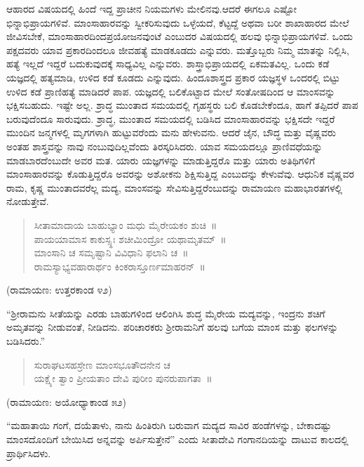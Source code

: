 ಆಹಾರದ ವಿಷಯದಲ್ಲಿ ಹಿಂದೆ ಇದ್ದ ಪ್ರಾಚೀನ ನಿಯಮಗಳು ಮೇಲಿನವು.ಆದರೆ ಈಗಲೂ ಎಷ್ಟೋ ಭಿನ್ನಾಭಿಪ್ರಾಯಗಳಿವೆ. ಮಾಂಸಾಹಾರವನ್ನು ಸ್ವೀಕರಿಸುವುದು ಒಳ್ಳೆಯದೆ, ಕೆಟ್ಟದ್ದೆ ಅಥವಾ ಬರೀ ಶಾಖಾಹಾರದ ಮೇಲೆ ಜೀವಿಸಬೇಕೆ, ಮಾಂಸಾಹಾರದಿಂದ\break ಪ್ರಯೋಜನವುಂಟೆ ಎಂಬುದರ ವಿಷಯದಲ್ಲಿ ಹಲವು ಭಿನ್ನಾಭಿಪ್ರಾಯಗಳಿವೆ. ಒಂದು ಪಕ್ಷದವರು ಯಾವ ಪ್ರಕಾರದಿಂದಲೂ ಜೀವಹತ್ಯೆ ಮಾಡಕೂಡದು ಎನ್ನುವರು. ಮತ್ತೊಬ್ಬರು ನಿಮ್ಮ ಮಾತನ್ನು ನಿಲ್ಲಿಸಿ, ಹತ್ಯೆ ಇಲ್ಲದೆ ಇದ್ದರೆ ಬದುಕುವುದಕ್ಕೆ ಸಾಧ್ಯವಿಲ್ಲ ಎನ್ನುವರು. ಶಾಸ್ತ್ರಾಭಿಪ್ರಾಯದಲ್ಲಿ ಏಕಮತವಿಲ್ಲ. ಒಂದು ಕಡೆ ಯಜ್ಞದಲ್ಲಿ ಹತ್ಯಮಾಡಿ, ಉಳಿದ ಕಡೆ ಕೂಡದು ಎನ್ನುವುದು. ಹಿಂದೂಶಾಸ್ತ್ರದ ಪ್ರಕಾರ ಯಜ್ಞಸ್ಥಳ ಒಂದರಲ್ಲಿ ಬಿಟ್ಟು ಉಳಿದ ಕಡೆ ಪ್ರಾಣಿಹತ್ಯೆ ಮಾಡಿದರೆ ಪಾಪ. ಯಜ್ಞದಲ್ಲಿ ಬಲಿಕೊಟ್ಟಾದ ಮೇಲೆ ಸಂತೋಷದಿಂದ ಆ ಮಾಂಸವನ್ನು ಭಕ್ಷಿಸಬಹುದು. ಇಷ್ಟೇ ಅಲ್ಲ. ಶ್ರಾದ್ಧ ಮುಂತಾದ ಸಮಯದಲ್ಲಿ ಗೃಹಸ್ಥರು ಬಲಿ ಕೊಡಬೇಕೆಂದೂ, ಹಾಗೆ ತಪ್ಪಿದರೆ ಪಾಪ ಬರುವುದೆಂದೂ ಸಾರುವುದು. ಶ್ರಾದ್ಧ, ಮುಂತಾದ ಸಮಯದಲ್ಲಿ ಬಡಿಸಿದ ಮಾಂಸಾಹಾರವನ್ನು ಭಕ್ಷಿಸದೇ ಇದ್ದರೆ ಮುಂದಿನ ಜನ್ಮಗಳಲ್ಲಿ ಮೃಗಗಳಾಗಿ ಹುಟ್ಟುವರೆಂದು ಮನು ಹೇಳುವನು. ಆದರೆ ಜೈನ, ಬೌದ್ಧ ಮತ್ತು ವೈಷ್ಣವರು ಅಂತಹ ಶಾಸ್ತ್ರವನ್ನು ನಾವು ನಂಬುವುದಿಲ್ಲವೆಂದು ತಿರಸ್ಕರಿಸಿದರು. ಯಾವ ಸಮಯದಲ್ಲೂ ಪ್ರಾಣಿವಧೆಯನ್ನು ಮಾಡಬಾರದೆಂಬುದೇ ಅವರ ಮತ. ಯಾರು ಯಜ್ಞಗಳನ್ನು ಮಾಡುತ್ತಿದ್ದರೊ ಮತ್ತು ಯಾರು ಅತಿಥಿಗಳಿಗೆ ಮಾಂಸಾಹಾರವನ್ನು ಕೊಡುತ್ತಿದ್ದರೊ ಅವರನ್ನು ಅಶೋಕನು ಶಿಕ್ಷಿಸುತ್ತಿದ್ದ ಎಂಬುದನ್ನು ಕೇಳುವೆವು. ಆಧುನಿಕ ವೈಷ್ಣವರ ರಾಮ, ಕೃಷ್ಣ ಮುಂತಾದವರೆಲ್ಲ ಮದ್ಯ, ಮಾಂಸವನ್ನು ಸೇವಿಸುತ್ತಿದ್ದರೆಂಬುದನ್ನು ರಾಮಾಯಣ ಮಹಾಭಾರತಗಳಲ್ಲಿ ನೋಡುತ್ತೇವೆ.

\begin{verse}
ಸೀತಾಮಾದಾಯ ಬಾಹುಭ್ಯಾಂ ಮಧು ಮೈರೇಯಕಂ ಶುಚಿ~॥\\ಪಾಯಯಾಮಾಸ ಕಾಕುಸ್ಸ್ಥಃ ಶಚೀಮಿಂದ್ರೋ ಯಥಾಮೃತಮ್​~॥\\ಮಾಂಸಾನಿ ಚ ಸಮೃಷ್ಟಾನಿ ವಿವಿಧಾನಿ ಫಲಾನಿ ಚ~॥\\ರಾಮಸ್ಯಾಭ್ಯವಹಾರಾರ್ಥಂ ಕಿಂಕರಾಸ್ತೂರ್ಣಮಾಹರನ್​~॥
\end{verse}

\begin{flushright}
(ರಾಮಾಯಣ: ಉತ್ತರಕಾಂಡ ೪೨)
\end{flushright}

“ಶ‍್ರೀರಾಮನು ಸೀತೆಯನ್ನು ಎರಡು ಬಾಹುಗಳಿಂದ ಆಲಿಂಗಿಸಿ ಶುದ್ಧ ಮೈರೇಯ ಮದ್ಯವನ್ನು, ಇಂದ್ರನು ಶಚಿಗೆ ಅಮೃತವನ್ನು ನೀಡುವಂತೆ, ನೀಡಿದನು. ಪರಿಚಾರಕರು ಶ‍್ರೀರಾಮನಿಗೆ ಹಲವು ಬಗೆಯ ಮಾಂಸ ಮತ್ತು ಫಲಗಳನ್ನು ಬಡಿಸಿದರು.”

\newpage

\begin{verse}
ಸುರಾಘಟಸಹಸ್ರೇಣ ಮಾಂಸಭೂತೌದನೇನ ಚ\\ಯಕ್ಷ್ಯೇ ತ್ವಾಂ ಪ್ರೀಯತಾಂ ದೇವಿ ಪುರೀಂ ಪುನರುಪಾಗತಾ~॥
\end{verse}

\begin{flushright}
(ರಾಮಾಯಣ: ಅಯೋಧ್ಯಾಕಾಂಡ ೫೨)
\end{flushright}

“ಮಹಾತಾಯಿ ಗಂಗೆ, ದಯೆತಾಳು, ನಾನು ಹಿಂತಿರುಗಿ ಬರುವಾಗ ಮದ್ಯದ ಸಾವಿರ ಹಂಡೆಗಳನ್ನು, ಬೇಕಾದಷ್ಟು ಮಾಂಸದೊಂದಿಗೆ ಬೇಯಿಸಿದ ಅನ್ನವನ್ನು ಅರ್ಪಿಸುತ್ತೇನೆ” ಎಂದು ಸೀತಾದೇವಿ ಗಂಗಾನದಿಯನ್ನು ದಾಟುವ ಕಾಲದಲ್ಲಿ ಪ್ರಾರ್ಥಿಸಿದಳು.

